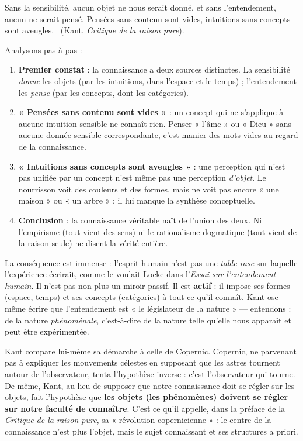 \documentclass[11pt]{article}
\newcounter{popsec}
\newcounter{popsub}
\newcommand{\courssub}[1]{%
  \stepcounter{popsub}%
  \par\vspace{9pt}\noindent{\popxbold\fontsize{11.5}{13}\selectfont\color{popink}{\color{poporange}\thepopsec.\thepopsub}\hspace{6pt}#1}\par\nopagebreak\vspace{4pt}
}
\begin{document}
\begin{experience}
\guillemotleft Sans la sensibilité, aucun objet ne nous serait donné, et sans l'entendement, aucun ne serait pensé. Pensées sans contenu sont vides, intuitions sans concepts sont aveugles. \guillemotright\ (Kant, \emph{Critique de la raison pure}).

Analysons pas à pas :
\begin{enumerate}
\item \textbf{Premier constat} : la connaissance a deux sources distinctes. La sensibilité \emph{donne} les objets (par les intuitions, dans l'espace et le temps) ; l'entendement les \emph{pense} (par les concepts, dont les catégories).
\item \textbf{« Pensées sans contenu sont vides »} : un concept qui ne s'applique à aucune intuition sensible ne connaît rien. Penser « l'âme » ou « Dieu » sans aucune donnée sensible correspondante, c'est manier des mots vides au regard de la connaissance.
\item \textbf{« Intuitions sans concepts sont aveugles »} : une perception qui n'est pas unifiée par un concept n'est même pas une perception \emph{d'objet}. Le nourrisson voit des couleurs et des formes, mais ne voit pas encore « une maison » ou « un arbre » : il lui manque la synthèse conceptuelle.
\item \textbf{Conclusion} : la connaissance véritable naît de l'union des deux. Ni l'empirisme (tout vient des sens) ni le rationalisme dogmatique (tout vient de la raison seule) ne disent la vérité entière.
\end{enumerate}
\end{experience}

\courssub{Portée : un esprit actif, législateur de la nature}

La conséquence est immense : l'esprit humain n'est pas une \emph{table rase} sur laquelle l'expérience écrirait, comme le voulait Locke dans l'\emph{Essai sur l'entendement humain}. Il n'est pas non plus un miroir passif. Il est \textbf{actif} : il impose ses formes (espace, temps) et ses concepts (catégories) à tout ce qu'il connaît. Kant ose même écrire que l'entendement est « le législateur de la nature » — entendons : de la nature \emph{phénoménale}, c'est-à-dire de la nature telle qu'elle nous apparaît et peut être expérimentée.

\begin{savaistu}
Kant compare lui-même sa démarche à celle de Copernic. Copernic, ne parvenant pas à expliquer les mouvements célestes en supposant que les astres tournent autour de l'observateur, tenta l'hypothèse inverse : c'est l'observateur qui tourne. De même, Kant, au lieu de supposer que notre connaissance doit se régler sur les objets, fait l'hypothèse que \textbf{les objets (les phénomènes) doivent se régler sur notre faculté de connaître}. C'est ce qu'il appelle, dans la préface de la \emph{Critique de la raison pure}, sa « révolution copernicienne » : le centre de la connaissance n'est plus l'objet, mais le sujet connaissant et ses structures a priori.
\end{savaistu}
\end{document}
